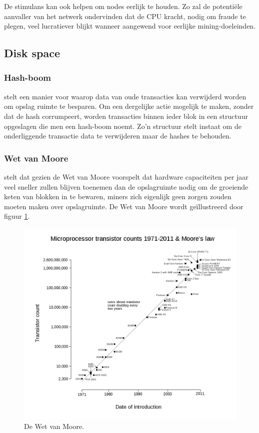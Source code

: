 		De stimulans kan ook helpen om nodes eerlijk te houden. Zo zal de potentiële aanvaller van het netwerk ondervinden dat de CPU kracht, nodig om fraude te plegen, veel lucratiever blijkt wanneer aangewend voor eerlijke mining-doeleinden. 
		
		
		
	\subsection{Disk space}
		\subsubsection{Hash-boom}
		\textcite{Nakamoto2008} stelt  een manier voor waarop data van oude transacties kan verwijderd worden om opslag ruimte te besparen. Om een dergelijke actie mogelijk te maken, zonder dat de hash corrumpeert, worden transacties binnen ieder blok in een structuur opgeslagen die men een hash-boom noemt. Zo’n structuur stelt instaat om de onderliggende transactie data te verwijderen maar de hashes te behouden.
		
		\subsubsection{Wet van Moore}	
		\textcite{Nakamoto2008} stelt dat gezien de Wet van Moore voorspelt dat hardware capaciteiten per jaar veel sneller zullen blijven toenemen dan de opslagruimte nodig om de groeiende keten van blokken in te bewaren, miners zich eigenlijk geen zorgen zouden moeten maken over opslagruimte. De Wet van Moore wordt geïllustreerd door figuur \ref{fig:moore}.
		\begin{figure}
			\includegraphics[width=\linewidth]{img/moore.png}
			\caption{De Wet van Moore.}
			\label{fig:moore}
		\end{figure}
		

